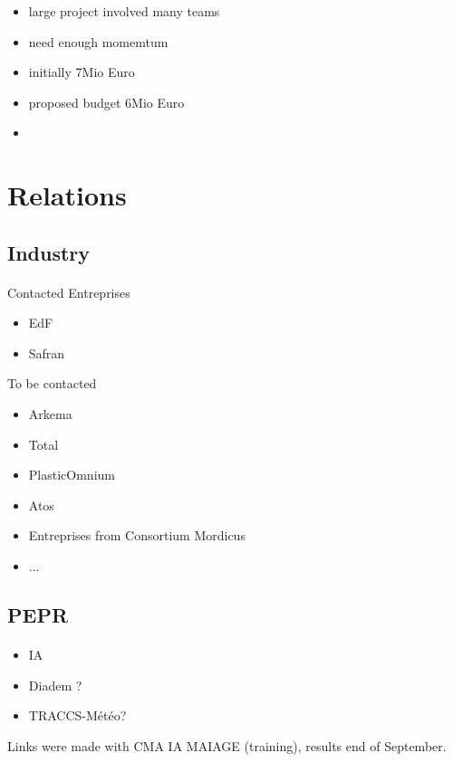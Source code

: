 \begin{frame}
  \frametitle{\insertsectionhead}
  \framesubtitle{\insertsubsectionhead}

  \begin{itemize}
    \item large project involved many teams
    \item need enough momemtum
    \item initially 7Mio Euro
    \item proposed budget 6Mio Euro
    \item 
  \end{itemize}

\end{frame}
\section{Relations}
\subsection{Industry}
\begin{frame}{\insertsectionhead}
  \framesubtitle{\insertsubsectionhead}
Contacted Entreprises
\begin{itemize}
    \item EdF
    \item Safran
\end{itemize}
To be contacted
\begin{itemize}
    \item Arkema
    \item Total
    \item PlasticOmnium
    \item Atos
    \item Entreprises from Consortium Mordicus
    \item ...
\end{itemize}
\end{frame}

\subsection{PEPR}
\begin{frame}{\insertsectionhead}
  \framesubtitle{\insertsubsectionhead}

\begin{itemize}
    \item IA
    \item Diadem ?
    \item TRACCS-Météo?
\end{itemize}

Links were made with CMA IA MAIAGE (training), results end of September.
\end{frame}


